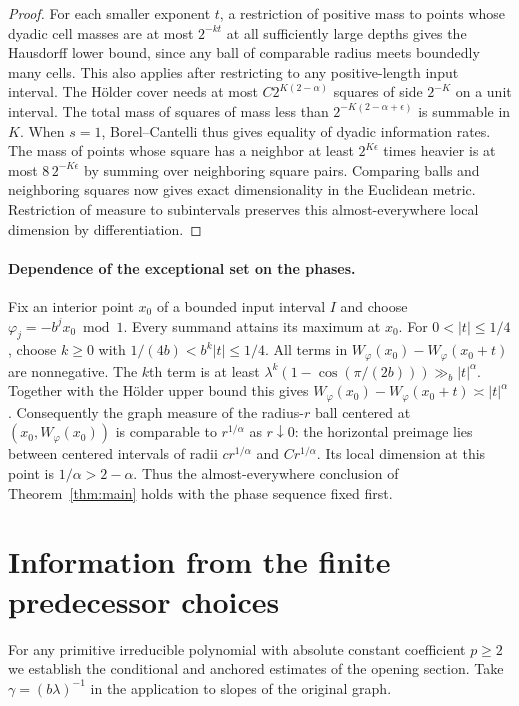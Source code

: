 \documentclass[11pt,a4paper]{article}
\begin{document}
\begin{proof}
For each smaller exponent $t$, a restriction of positive mass to points whose dyadic cell masses are at most $2^{-kt}$ at all sufficiently large depths gives the Hausdorff lower bound, since any ball of comparable radius meets boundedly many cells. This also applies after restricting to any positive-length input interval. The H\"older cover needs at most $C2^{K(2-\alpha)}$ squares of side $2^{-K}$ on a unit interval. The total mass of squares of mass less than $2^{-K(2-\alpha+\epsilon)}$ is summable in $K$. When $s=1$, Borel--Cantelli thus gives equality of dyadic information rates. The mass of points whose square has a neighbor at least $2^{K\epsilon}$ times heavier is at most $8\,2^{-K\epsilon}$ by summing over neighboring square pairs. Comparing balls and neighboring squares now gives exact dimensionality in the Euclidean metric. Restriction of measure to subintervals preserves this almost-everywhere local dimension by differentiation.
\end{proof}



\paragraph{Dependence of the exceptional set on the phases.}
Fix an interior point $x_0$ of a bounded input interval $I$ and choose
$\varphi_j=-b^j x_0\bmod 1$. Every summand attains its maximum at $x_0$.
For $0<|t|\le1/4$, choose $k\ge0$ with $1/(4b)<b^k|t|\le1/4$.
All terms in $W_\varphi(x_0)-W_\varphi(x_0+t)$ are nonnegative. The
$k$th term is at least $\lambda^k(1-\cos(\pi/(2b)))\gg_b |t|^\alpha$.
Together with the H\"older upper bound this gives
$W_\varphi(x_0)-W_\varphi(x_0+t)\asymp |t|^\alpha$.
Consequently the graph measure of the radius-$r$ ball centered at
$(x_0,W_\varphi(x_0))$ is comparable to $r^{1/\alpha}$ as $r\downarrow0$:
the horizontal preimage lies between centered intervals of radii
$c r^{1/\alpha}$ and $C r^{1/\alpha}$. Its local dimension at this
point is $1/\alpha>2-\alpha$. Thus the almost-everywhere conclusion of
Theorem~\ref{thm:main} holds with the phase sequence fixed first.

\section{Information from the finite predecessor choices}\label{app:pred}
For any primitive irreducible polynomial with absolute constant coefficient $p\ge2$ we establish the conditional and anchored estimates of the opening section. Take $\gamma=(b\lambda)^{-1}$ in the application to slopes of the original graph.
\end{document}
